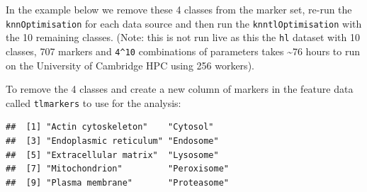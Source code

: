 In the example below we remove these 4 classes from the marker set,
re-run the \texttt{knnOptimisation} for each data source and then run
the \texttt{knntlOptimisation} with the 10 remaining classes. (Note:
this is not run live as this the \texttt{hl} dataset with 10 classes,
707 markers and \texttt{4\^{}10} combinations of parameters takes
\textasciitilde{}76 hours to run on the University of Cambridge HPC
using 256 workers).

To remove the 4 classes and create a new column of markers in the
feature data called \texttt{tlmarkers} to use for the analysis:

\begin{Shaded}
\begin{Highlighting}[]
\StringTok{ }
\StringTok{ }

\StringTok{ }\NormalTok{(}\NormalTok{, }\NormalTok{,}
           \NormalTok{, }
           \NormalTok{)}
  \StringTok{ }  \NormalTok{)}
  \StringTok{ }  \NormalTok{)}
\NormalTok{\}}
 \NormalTok{)}
\end{Highlighting}
\end{Shaded}

\begin{verbatim}
##  [1] "Actin cytoskeleton"    "Cytosol"              
##  [3] "Endoplasmic reticulum" "Endosome"             
##  [5] "Extracellular matrix"  "Lysosome"             
##  [7] "Mitochondrion"         "Peroxisome"           
##  [9] "Plasma membrane"       "Proteasome"
\end{verbatim}

\begin{Shaded}
\begin{Highlighting}[]
 \NormalTok{)}
\end{Highlighting}
\end{Shaded}

